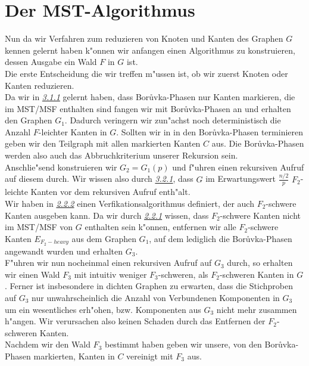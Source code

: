 \section{Der MST-Algorithmus}

Nun da wir Verfahren zum reduzieren von Knoten und Kanten des Graphen $G$ kennen
    gelernt haben  k"onnen wir anfangen einen Algorithmus zu konstruieren,
    dessen Ausgabe ein Wald $F$ in $G$ ist.\\
Die erste Entscheidung die wir treffen m"ussen ist, ob wir zuerst Knoten oder Kanten
    reduzieren. \\
Da wir in \hyperref[sec:borIdea]{\textit{3.1.1}} gelernt haben, dass
    Bor\r uvka-Phasen nur Kanten markieren, die im MST/MSF 
    enthalten sind fangen wir mit Bor\r uvka-Phasen an und erhalten den Graphen 
    $G_1$.
    Dadurch veringern wir
    zun"achst noch deterministisch die Anzahl $F$-leichter Kanten in $G$.
    Sollten wir in in den Bor\r uvka-Phasen terminieren geben wir den Teilgraph
    mit allen markierten Kanten $C$ aus.
    Die Bor\r uvka-Phasen werden also auch das Abbruchkriterium unserer
    Rekursion sein.\\
Anschlie"send konstruieren wir $G_2 = G_1(p)$ und f"uhren einen rekursiven
    Aufruf auf diesem durch. 
    Wir wissen also durch \hyperref[sec:goodnessRand]{\textit{3.2.1}}, 
    dass $G$ im Erwartungswert
    $\frac{n/2}{p}$ $F_2$-leichte Kanten vor dem rekursiven Aufruf enth"alt.\\
Wir haben in \hyperref[sec:verification]{\textit{2.2.2}} einen 
    Verfikationsalgorithmus definiert, der auch $F_2$-schwere Kanten ausgeben
    kann.
    Da wir durch \hyperref[sec:fProof]{\textit{2.2.1}} wissen, dass $F_2$-schwere Kanten nicht im MST/MSF von $G$
    enthalten sein k"onnen, entfernen wir alle $F_2$-schwere Kanten $E_{F_2-heavy}$
    aus dem Graphen $G_1$,
    auf dem lediglich die Bor\r uvka-Phasen angewandt wurden und erhalten $G_3$.\\
F"uhren wir nun nocheinmal einen rekursiven Aufruf auf $G_3$ durch, 
    so erhalten wir 
    einen Wald $F_3$ mit intuitiv weniger $F_3$-schweren, als $F_2$-schweren Kanten in $G$.
    Ferner ist insbesondere in dichten Graphen zu erwarten, dass die Stichproben 
    auf $G_3$ nur unwahrscheinlich die Anzahl von Verbundenen Komponenten in 
    $G_3$ um ein wesentliches erh"ohen, bzw. Komponenten aus $G_3$ nicht mehr
    zusammen h"angen.
    Wir verursachen also keinen Schaden durch das Entfernen der $F_2$-schweren
    Kanten.\\
Nachdem wir den Wald $F_3$ bestimmt haben geben wir unsere, von den Bor\r uvka-Phasen
    markierten, Kanten in $C$ vereinigt mit $F_3$ aus.\\


